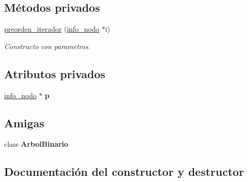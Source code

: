 \subsection*{Métodos privados}
\begin{DoxyCompactItemize}
\item 
\hyperlink{classArbolBinario_1_1preorden__iterador_a92fb618fbbec65a3a1d4ef434e0b7784}{preorden\+\_\+iterador} (\hyperlink{structArbolBinario_1_1info__nodo}{info\+\_\+nodo} $\ast$i)
\begin{DoxyCompactList}\small\item\em Constructo con parametros. \end{DoxyCompactList}\end{DoxyCompactItemize}
\subsection*{Atributos privados}
\begin{DoxyCompactItemize}
\item 
\mbox{\label{classArbolBinario_1_1preorden__iterador_a1a0cb29b3eb01d2e549aa7b293b6aff1}} 
\hyperlink{structArbolBinario_1_1info__nodo}{info\+\_\+nodo} $\ast$ {\bfseries p}
\end{DoxyCompactItemize}
\subsection*{Amigas}
\begin{DoxyCompactItemize}
\item 
\mbox{\label{classArbolBinario_1_1preorden__iterador_a7aaf1bc41122321eaeb4dcc50d489fe8}} 
class {\bfseries Arbol\+Binario}
\end{DoxyCompactItemize}


\subsection{Documentación del constructor y destructor}
\mbox{\label{classArbolBinario_1_1preorden__iterador_a92fb618fbbec65a3a1d4ef434e0b7784}} 
